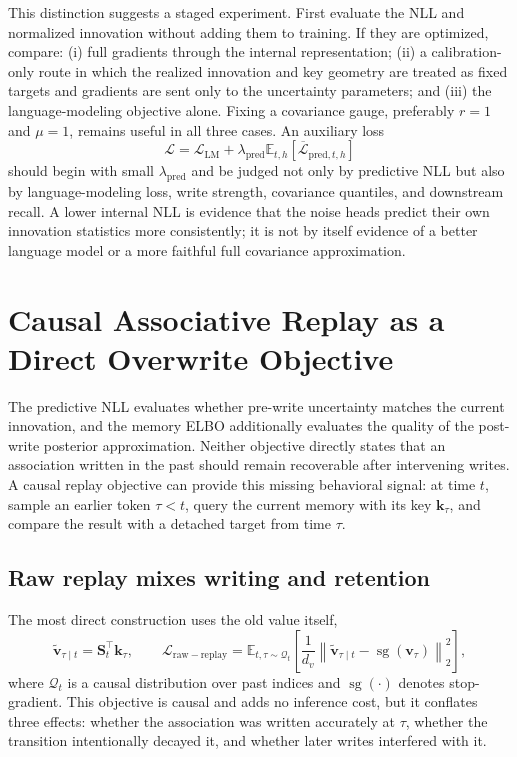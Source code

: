 \documentclass[11pt]{article}
\newcommand{\vct}[1]{\boldsymbol{#1}}
\begin{document}
This distinction suggests a staged experiment. First evaluate the NLL and normalized innovation
without adding them to training. If they are optimized, compare: (i) full gradients through the
internal representation; (ii) a calibration-only route in which the realized innovation and key
geometry are treated as fixed targets and gradients are sent only to the uncertainty parameters;
and (iii) the language-modeling objective alone. Fixing a covariance gauge, preferably $r=1$ and
$\mu=1$, remains useful in all three cases. An auxiliary loss
\begin{equation}
  \mathcal{L}
  =\mathcal{L}_{\mathrm{LM}}
   +\lambda_{\mathrm{pred}}
    \mathbb{E}_{t,h}\!\left[
      \overline{\mathcal{L}}_{\mathrm{pred},t,h}
    \right]
  \label{eq:discussion-lm-plus-predictive-nll}
\end{equation}
should begin with small $\lambda_{\mathrm{pred}}$ and be judged not only by predictive NLL but
also by language-modeling loss, write strength, covariance quantiles, and downstream recall. A
lower internal NLL is evidence that the noise heads predict their own innovation statistics more
consistently; it is not by itself evidence of a better language model or a more faithful full
covariance approximation.

\section{Causal Associative Replay as a Direct Overwrite Objective}
\label{sec:discussion-associative-replay}

The predictive NLL evaluates whether pre-write uncertainty matches the current innovation, and the
memory ELBO additionally evaluates the quality of the post-write posterior approximation. Neither
objective directly states that an association written in the past should remain recoverable after
intervening writes. A causal replay objective can provide this missing behavioral signal: at time
$t$, sample an earlier token $\tau<t$, query the current memory with its key $\vct{k}_\tau$, and
compare the result with a detached target from time $\tau$.

\subsection{Raw replay mixes writing and retention}

The most direct construction uses the old value itself,
\begin{equation}
  \widetilde{\vct{v}}_{\tau\mid t}
  =\vct{S}_t^\top\vct{k}_\tau,
  \qquad
  \mathcal{L}_{\mathrm{raw-replay}}
  =\mathbb{E}_{t,\tau\sim\mathcal{Q}_t}\!\left[
    \frac{1}{d_v}
    \left\|
      \widetilde{\vct{v}}_{\tau\mid t}
      -\operatorname{sg}(\vct{v}_\tau)
    \right\|_2^2
  \right],
  \label{eq:discussion-raw-replay-loss}
\end{equation}
where $\mathcal{Q}_t$ is a causal distribution over past indices and
$\operatorname{sg}(\cdot)$ denotes stop-gradient. This objective is causal and adds no inference
cost, but it conflates three effects: whether the association was written accurately at $\tau$,
whether the transition intentionally decayed it, and whether later writes interfered with it.
\end{document}
